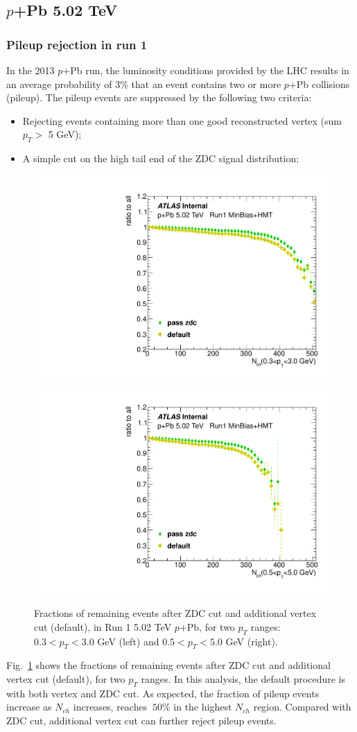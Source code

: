 \subsection{$p$+Pb 5.02 TeV}
\subsubsection{Pileup rejection in run 1}
In the 2013 $p$+Pb run, the luminosity conditions provided by the LHC results in an average probability of $3\%$ that an event contains two or more $p$+Pb collisions (pileup). The pileup events are suppressed by the following two criteria:~\cite{atlas:9}
\begin{itemize}
\item Rejecting events containing more than one good reconstructed vertex (sum $p_{T} >$ 5 GeV);
\item A simple cut on the high tail end of the ZDC signal distribution;
\end{itemize}

\begin{figure}[H]
\centering
\includegraphics[width=0.45\linewidth]{figs/sec_sys/pPb5/PU_cnt_Pt0.pdf}
\includegraphics[width=0.45\linewidth]{figs/sec_sys/pPb5/PU_cnt_Pt1.pdf}
\caption{Fractions of remaining events after ZDC cut and additional vertex cut (default), in Run 1 5.02 TeV $p$+Pb, for two $p_{T}$ ranges: $0.3<p_{T}<3.0$ GeV (left) and $0.5<p_{T}<5.0$ GeV (right).}
\label{fig:chk_PU_cnt}
\end{figure}
Fig.~\ref{fig:chk_PU_cnt} shows the fractions of remaining events after ZDC cut and additional vertex cut (default), for two $p_{T}$ ranges. In this analysis, the default procedure is with both vertex and ZDC cut. As expected, the fraction of pileup events increase as $N_{ch}$ increases, reaches $~50\%$ in the highest $N_{ch}$ region. Compared with ZDC cut, additional vertex cut can further reject pileup events.

